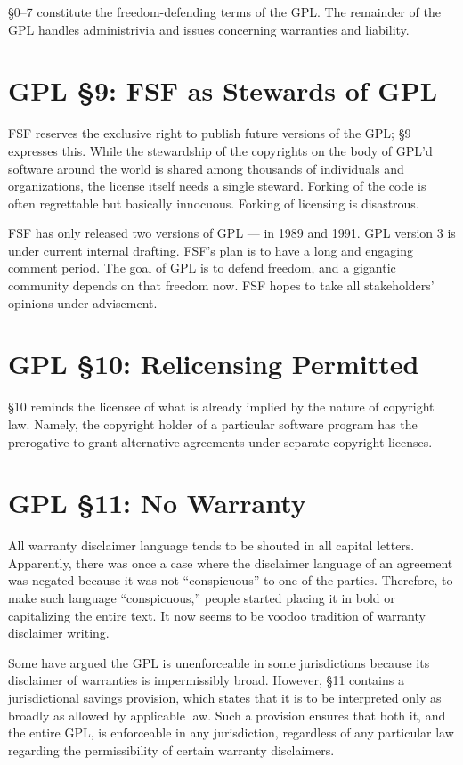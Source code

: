 \documentclass[11pt, letterpaper]{book}
\begin{document}
\S 0--7 constitute the freedom-defending terms of the GPL. The remainder
of the GPL handles administrivia and issues concerning warranties and
liability.

\section{GPL \S 9: FSF as Stewards of GPL}
\label{GPLs9}

FSF reserves the exclusive right to publish future versions of the GPL\@;
\S 9 expresses this. While the stewardship of the copyrights on the body
of GPL'd software around the world is shared among thousands of
individuals and organizations, the license itself needs a single steward.
Forking of the code is often regrettable but basically innocuous. Forking
of licensing is disastrous.

FSF has only released two versions of GPL --- in 1989 and 1991. GPL
version 3 is under current internal drafting. FSF's plan is to have a
long and engaging comment period. The goal of GPL is to defend freedom, and
a gigantic community depends on that freedom now. FSF hopes to take all
stakeholders' opinions under advisement.

\section{GPL \S 10: Relicensing Permitted}
\label{GPLs10}

\S 10 reminds the licensee of what is already implied by the nature of
copyright law. Namely, the copyright holder of a particular software
program has the prerogative to grant alternative agreements under separate
copyright licenses.

\section{GPL \S 11: No Warranty}
\label{GPLs11}

All warranty disclaimer language tends to be shouted in all capital
letters. Apparently, there was once a case where the disclaimer language
of an agreement was negated because it was not ``conspicuous'' to one of
the parties. Therefore, to make such language ``conspicuous,'' people
started placing it in bold or capitalizing the entire text. It now seems
to be voodoo tradition of warranty disclaimer writing.

Some have argued the GPL is unenforceable in some jurisdictions because
its disclaimer of warranties is impermissibly broad. However, \S 11
contains a jurisdictional savings provision, which states that it is to be
interpreted only as broadly as allowed by applicable law. Such a
provision ensures that both it, and the entire GPL, is enforceable in any
jurisdiction, regardless of any particular law regarding the
permissibility of certain warranty disclaimers.
\end{document}
